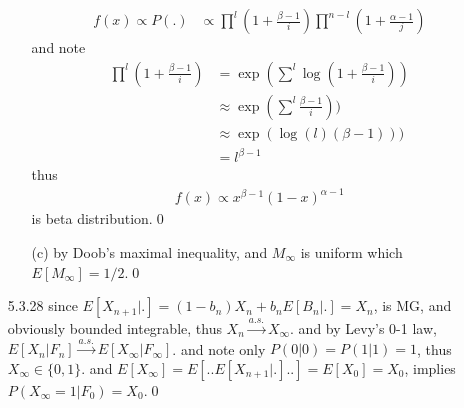 \documentclass[paper=a4, fontsize=11pt]{scrartcl} %
\numberwithin{equation}{section} %
\numberwithin{figure}{section} %
\numberwithin{table}{section} %
\begin{document}
\begin{itemize}
\begin{itemize}
		\begin{align}
			f(x)\propto P(.)&\propto \prod^l (1+\frac{\beta-1}{i})\prod^{n-l} (1+\frac{\alpha-1}{j})
		\end{align}
		and note 
		\begin{align}
			\prod^l (1+\frac{\beta-1}{i}) &= \exp(\sum^l \log (1+\frac{\beta-1}{i}))\\
			&\approx \exp(\sum^l \frac{\beta-1}{i}))\\
			&\approx \exp(\log(l)(\beta-1)))\\
			&= l^{\beta-1}
		\end{align}
		thus
		\begin{align}
			f(x) \propto x^{\beta-1}(1-x)^{\alpha-1}
		\end{align}
		is beta distribution.\qed
		\item[(c)] by Doob's maximal inequality, and $M_{\infty}$ is uniform which $E[M_{\infty}]=1/2$.\qed
	\end{itemize}
	\item[5.3.28] since $E[X_{n+1}|.]= (1-b_n)X_n + b_nE[B_n|.]= X_n$, is MG, and obviously bounded integrable, thus $X_n\stackrel{a.s.}{\rightarrow} X_{\infty}$. and by Levy's 0-1 law, $E[X_n|F_n]\stackrel{a.s.}{\rightarrow} E[X_\infty|F_\infty]$. and note only $P(0|0)=P(1|1)=1$, thus $X_{\infty}\in \{0,1\}$. and $E[X_\infty]=E[..E[X_{n+1}|.]..] = E[X_0]=X_0$, implies $P(X_\infty=1|F_0)=X_0$.\qed
\end{itemize}
\end{document}
